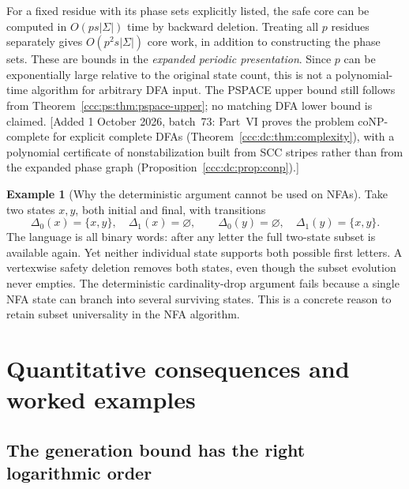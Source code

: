 \documentclass[11pt,letterpaper]{article}
\theoremstyle{definition}
\newtheorem{example}[theorem]{Example}
\theoremstyle{remark}
\newcommand{\waddsevthree}[1]{\textup{[}Added 1 October 2026, batch~73: #1\textup{]}}
\begin{document}
For a fixed residue with its phase sets explicitly listed, the safe core
can be computed in $O(ps|\Sigma|)$ time by backward deletion. Treating all
$p$ residues separately gives $O(p^2s|\Sigma|)$ core work, in addition to
constructing the phase sets. These are bounds in the \emph{expanded
periodic presentation}. Since $p$ can be exponentially large relative to
the original state count, this is not a polynomial-time algorithm for
arbitrary DFA input. The PSPACE upper bound still follows from
Theorem~\ref{ccc:ps:thm:pspace-upper}; no matching DFA lower bound is claimed.
\waddsevthree{Part~VI proves the problem coNP-complete for explicit complete
DFAs (Theorem~\ref{ccc:dc:thm:complexity}), with a polynomial certificate of
nonstabilization built from SCC stripes rather than from the expanded
phase graph (Proposition~\ref{ccc:dc:prop:conp}).}

\begin{example}[Why the deterministic argument cannot be used on NFAs]
\label{ccc:ps:ex:nondeterministic}
Take two states $x,y$, both initial and final, with transitions
\[
 \Delta_0(x)=\{x,y\},\quad \Delta_1(x)=\varnothing,\qquad
 \Delta_0(y)=\varnothing,\quad \Delta_1(y)=\{x,y\}.
\]
The language is all binary words: after any letter the full two-state
subset is available again. Yet neither individual state supports both
possible first letters. A vertexwise safety deletion removes both states,
even though the subset evolution never empties. The deterministic
cardinality-drop argument fails because a single NFA state can branch
into several surviving states. This is a concrete reason to retain subset
universality in the NFA algorithm.
\end{example}

\section{Quantitative consequences and worked examples}\label{ccc:ps:sec:examples}

\subsection{The generation bound has the right logarithmic order}
\end{document}
